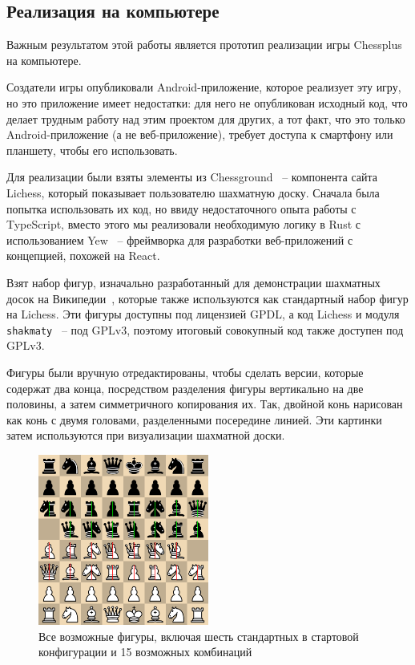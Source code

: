 \documentclass{article}
\begin{document}
\subsection{Реализация на компьютере}

Важным результатом этой работы является прототип реализации игры Chessplus
на компьютере.

Создатели игры опубликовали Android-приложение,
которое реализует эту игру,
но это приложение имеет недостатки:
для него не опубликован исходный код,
что делает трудным работу над этим проектом для других,
а тот факт, что это только Android-приложение
(а не веб-приложение),
требует доступа к смартфону или планшету, чтобы его использовать.

Для реализации были взяты элементы из Chessground~\cite{lichess-chessground} --
компонента сайта Lichess, который показывает пользователю шахматную доску.
Сначала была попытка использовать их код,
но ввиду недостаточного опыта работы с TypeScript,
вместо этого мы реализовали необходимую логику в Rust
с использованием Yew~\cite{yewstack-yew} -- фреймворка для разработки веб-приложений
с концепцией, похожей на React.

Взят набор фигур, изначально разработанный для демонстрации шахматных досок на Википедии~\cite{cburnett-pieces},
которые также используются как стандартный набор фигур на Lichess.
Эти фигуры доступны под лицензией GPDL,
а код Lichess и модуля \texttt{shakmaty}~\cite{shakmaty-crate} -- под GPLv3,
поэтому итоговый совокупный код также доступен под GPLv3.

Фигуры были вручную отредактированы, чтобы сделать версии,
которые содержат два конца,
посредством разделения фигуры вертикально на две половины,
а затем симметричного копирования их.
Так, двойной конь нарисован как конь с двумя головами,
разделенными посередине линией.
Эти картинки затем используются при визуализации шахматной доски.

\begin{figure}[h]
    \centering
    \includegraphics[width=0.5\textwidth]{img/all-pieces-demo.png}
    \caption{Все возможные фигуры, включая шесть стандартных в стартовой конфигурации и 15 возможных комбинаций}
\end{figure}
\end{document}

